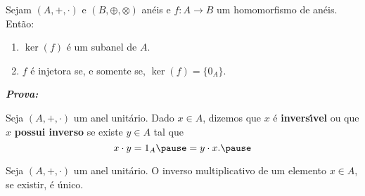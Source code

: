 \documentclass{beamer}
\begin{document}
    \begin{frame}
        \begin{proposicao}
            Sejam $(A, +, \cdot)$ e $(B, \oplus, \otimes)$ an\'eis \pause e $f : A \to B$ um homomorfismo de an\'eis. \pause Ent\~ao:\pause
            \begin{enumerate}[label={\roman*})]
                \item $\ker(f)$ \'e um subanel de $A$.\pause

                \vspace{.5cm}

                \item $f$ \'e injetora \pause se, e somente se, \pause $\ker(f) = \{0_A\}$.\pause

                \vspace{.5cm}
            \end{enumerate}
        \end{proposicao}
    \end{frame}

    \begin{frame}
        \noindent \textbf{\textit{Prova: }}

        \vspace{6.5cm}
    \end{frame}

    \begin{frame}
        \begin{definicao}
            Seja $(A, +, \cdot)$ um anel unit\'ario. \pause Dado $x \in A$, \pause dizemos que $x$ \'e \textbf{invers{\'\i}vel} \pause ou que $x$ \textbf{possui inverso} \pause se existe $y \in A$ \pause tal que\pause
            \[
                x \cdot y = 1_A \pause = y \cdot x.\pause
            \]
        \end{definicao}
    \end{frame}

    \begin{frame}
        \begin{proposicao}
            Seja $(A, +, \cdot)$ um anel unit\'ario. \pause O inverso multiplicativo de um elemento $x \in A$, \pause se existir, \pause \'e \'unico.\pause
        \end{proposicao}
    \end{frame}
\end{document}

